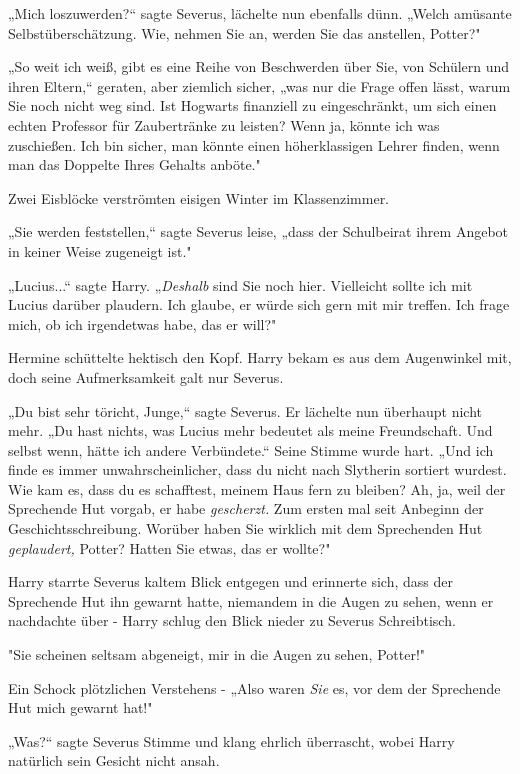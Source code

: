 {„Mich loszuwerden?“ sagte Severus, lächelte nun ebenfalls dünn. „Welch amüsante Selbstüberschätzung. Wie, nehmen Sie an, werden Sie das anstellen, Potter?"

„So weit ich weiß, gibt es eine Reihe von Beschwerden über Sie, von Schülern und ihren Eltern,“ geraten, aber ziemlich sicher, „was nur die Frage offen lässt, warum Sie noch nicht weg sind. Ist Hogwarts finanziell zu eingeschränkt, um sich einen echten Professor für Zaubertränke zu leisten? Wenn ja, könnte ich was zuschießen. Ich bin sicher, man könnte einen höherklassigen Lehrer finden, wenn man das Doppelte Ihres Gehalts anböte."

Zwei Eisblöcke verströmten eisigen Winter im Klassenzimmer.

„Sie werden feststellen,“ sagte Severus leise, „dass der Schulbeirat ihrem Angebot in keiner Weise zugeneigt ist."

„Lucius...“ sagte Harry. „\emph{Deshalb} sind Sie noch hier. Vielleicht sollte ich mit Lucius darüber plaudern. Ich glaube, er würde sich gern mit mir treffen. Ich frage mich, ob ich irgendetwas habe, das er will?"

Hermine schüttelte hektisch den Kopf. Harry bekam es aus dem Augenwinkel mit, doch seine Aufmerksamkeit galt nur Severus.

„Du bist sehr töricht, Junge,“ sagte Severus. Er lächelte nun überhaupt nicht mehr. „Du hast nichts, was Lucius mehr bedeutet als meine Freundschaft. Und selbst wenn, hätte ich andere Verbündete.“ Seine Stimme wurde hart. „Und ich finde es immer unwahrscheinlicher, dass du nicht nach Slytherin sortiert wurdest. Wie kam es, dass du es schafftest, meinem Haus fern zu bleiben? Ah, ja, weil der Sprechende Hut vorgab, er habe \emph{gescherzt.} Zum ersten mal seit Anbeginn der Geschichtsschreibung. Worüber haben Sie wirklich mit dem Sprechenden Hut \emph{geplaudert,} Potter? Hatten Sie etwas, das er wollte?"

Harry starrte Severus kaltem Blick entgegen und erinnerte sich, dass der Sprechende Hut ihn gewarnt hatte, niemandem in die Augen zu sehen, wenn er nachdachte über - Harry schlug den Blick nieder zu Severus Schreibtisch.

"Sie scheinen seltsam abgeneigt, mir in die Augen zu sehen, Potter!"

Ein Schock plötzlichen Verstehens - „Also waren \emph{Sie} es, vor dem der Sprechende Hut mich gewarnt hat!"

„Was?“ sagte Severus Stimme und klang ehrlich überrascht, wobei Harry natürlich sein Gesicht nicht ansah.

}

